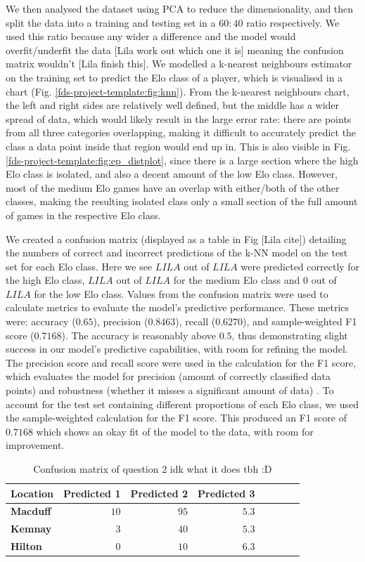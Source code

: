 \documentclass[10pt,a4paper,twocolumn]{article}
\begin{document}
We then analysed the dataset using PCA to reduce the dimensionality, and then split the data into a training and testing set in a $60:40$ ratio respectively. We used this ratio because any wider a difference and the model would overfit/underfit the data [Lila work out which one it is] meaning the confusion matrix wouldn't [Lila finish this]. We modelled a k-nearest neighbours estimator on the training set to predict the Elo class of a player, which is visualised in a chart (Fig. \ref{fds-project-template:fig:knn}). From the k-nearest neighbours chart, the left and right sides are relatively well defined, but the middle has a wider spread of data, which would likely result in the large error rate: there are points from all three categories overlapping, making it difficult to accurately predict the class a data point inside that region would end up in. This is also visible in Fig. \ref{fds-project-template:fig:ep_distplot}, since there is a large section where the high Elo class is isolated, and also a decent amount of the low Elo class. However, most of the medium Elo games have an overlap with either/both of the other classes, making the resulting isolated class only 
a small section of the full amount of games in the respective Elo class.\newline

We created a confusion matrix (displayed as a table in Fig [Lila cite]) detailing the numbers of correct and incorrect predictions of the k-NN model on the test set for each Elo class. Here we see $ LILA $ out of $LILA$ were predicted correctly for the high Elo class, $LILA$ out of $LILA$ for the medium Elo class and $0$ out of $LILA$ for the low Elo class. Values from the confusion matrix were used to calculate metrics to evaluate the model's predictive performance. These metrics were: accuracy ($0.65$), precision ($0.8463$), recall ($0.6270$), and sample-weighted F1 score ($0.7168$). The accuracy is reasonably above $0.5$, thus demonstrating slight success in our model's predictive capabilities, with room for refining the model. The precision score and recall score were used in the calculation for the F1 score, which evaluates the model for precision (amount of correctly classified data points) and robustness (whether it misses a significant amount of data) \cite{MetricsToEvaluateYourML}. To account for the test set containing different proportions of each Elo class, we used the sample-weighted calculation for the F1 score. This produced an F1 score of $0.7168$ which shows an okay fit of the model to the data, with room for improvement. \newline
\begin{table}[b]
  \centering
  \caption{Confusion matrix of question 2 idk what it does tbh :D}
  \label{tab:confusion_matrix}
\begin{tabular}{lrrrrrrr}
\hline
\textbf{Location}&\textbf{Predicted 1}&\textbf{Predicted 2}&\textbf{Predicted 3}\\
\hline
\textbf{Macduff}&$10$&$ 95$&$5.3$\tabularnewline
\textbf{Kemnay}&$ 3$&$ 40$&$5.3$\tabularnewline
\textbf{Hilton}&$ 0$&$ 10$&$6.3$\tabularnewline
\hline
\end{tabular}
\end{table}
\end{document}
